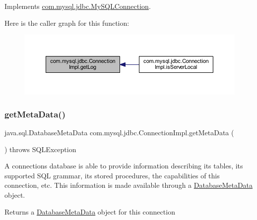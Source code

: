 Implements \mbox{\hyperlink{interfacecom_1_1mysql_1_1jdbc_1_1_my_s_q_l_connection_a3faf787772351caedf8e95f28c09c4cd}{com.\+mysql.\+jdbc.\+My\+S\+Q\+L\+Connection}}.

Here is the caller graph for this function\+:\nopagebreak
\begin{figure}[H]
\begin{center}
\leavevmode
\includegraphics[width=350pt]{classcom_1_1mysql_1_1jdbc_1_1_connection_impl_ae8304e8374b4789fe5f73120bccb7143_icgraph}
\end{center}
\end{figure}
\mbox{\label{classcom_1_1mysql_1_1jdbc_1_1_connection_impl_aa16ed222f78d8d0202446aafb5330612}} 
\subsubsection{\texorpdfstring{get\+Meta\+Data()}{getMetaData()}}
{\footnotesize\ttfamily java.\+sql.\+Database\+Meta\+Data com.\+mysql.\+jdbc.\+Connection\+Impl.\+get\+Meta\+Data (\begin{DoxyParamCaption}{ }\end{DoxyParamCaption}) throws S\+Q\+L\+Exception}

A connection\textquotesingle{}s database is able to provide information describing its tables, its supported S\+QL grammar, its stored procedures, the capabilities of this connection, etc. This information is made available through a \mbox{\hyperlink{classcom_1_1mysql_1_1jdbc_1_1_database_meta_data}{Database\+Meta\+Data}} object.

\begin{DoxyReturn}{Returns}
a \mbox{\hyperlink{classcom_1_1mysql_1_1jdbc_1_1_database_meta_data}{Database\+Meta\+Data}} object for this connection 
\end{DoxyReturn}

